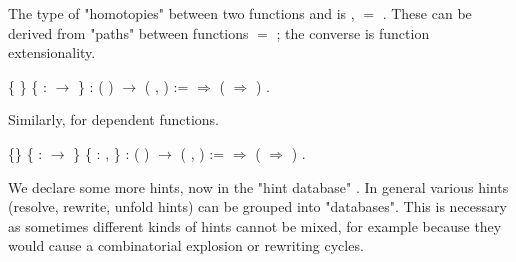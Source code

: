 \documentclass[12pt]{report}
\begin{document}
The type of "homotopies" between two functions  and  is
   \coqdockw{\ensuremath{\forall}} ,   $=$  .  These can be derived from "paths" between
   functions  $=$ ; the converse is function extensionality. \begin{coqdoccode}
\coqdocemptyline
\coqdocnoindent
{}  \{ \} \{  :  \ensuremath{\rightarrow} \} : (  ) \ensuremath{\rightarrow} (\coqdockw{\ensuremath{\forall}} ,     ) :=\coqdoceol
\coqdocindent{1.00em}
   \ensuremath{\Rightarrow}  (  \ensuremath{\Rightarrow}  ) .\coqdoceol
\coqdocemptyline
\end{coqdoccode}
Similarly,  for dependent functions. \begin{coqdoccode}
\coqdocemptyline
\coqdocnoindent
{}  \{\} \{ :  \ensuremath{\rightarrow} \} \{  : \coqdockw{\ensuremath{\forall}} ,  \} :\coqdoceol
\coqdocindent{1.00em}
(  ) \ensuremath{\rightarrow} (\coqdockw{\ensuremath{\forall}} ,     ) :=\coqdoceol
\coqdocindent{1.00em}
   \ensuremath{\Rightarrow}  (  \ensuremath{\Rightarrow}  ) .\coqdoceol
\coqdocemptyline
\end{coqdoccode}
We declare some more   hints, now in the "hint
   database" .  In general various hints (resolve,
   rewrite, unfold hints) can be grouped into "databases". This is
   necessary as sometimes different kinds of hints cannot be mixed,
   for example because they would cause a combinatorial explosion or
   rewriting cycles.
\end{document}
